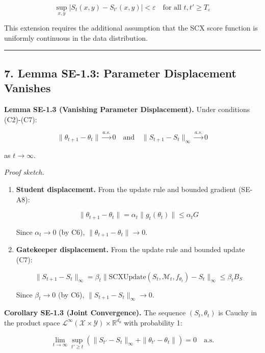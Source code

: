 \documentclass[
  12pt,
]{article}
\begin{document}
\[
\sup_{x,y} |S_t(x,y) - S_{t'}(x,y)| < \varepsilon \quad \text{for all } t, t' \geq T_\varepsilon
\]

This extension requires the additional assumption that the SCX score
function is uniformly continuous in the data distribution.

\begin{center}\rule{0.5\linewidth}{0.5pt}\end{center}

\subsection{7. Lemma SE-1.3: Parameter Displacement
Vanishes}\label{lemma-se-1.3-parameter-displacement-vanishes}

\textbf{Lemma SE-1.3 (Vanishing Parameter Displacement).} Under
conditions (C2)-(C7):

\[
\|\theta_{t+1} - \theta_t\| \xrightarrow{a.s.} 0 \quad \text{and} \quad \|S_{t+1} - S_t\|_\infty \xrightarrow{a.s.} 0
\]

as \(t \to \infty\).

\emph{Proof sketch.}

\begin{enumerate}
\def\labelenumi{\arabic{enumi}.}
\item
  \textbf{Student displacement.} From the update rule and bounded
  gradient (SE-A8):

  \[
  \|\theta_{t+1} - \theta_t\| = \alpha_t \|g_t(\theta_t)\| \leq \alpha_t G
  \]

  Since \(\alpha_t \to 0\) (by C6),
  \(\|\theta_{t+1} - \theta_t\| \to 0\).
\item
  \textbf{Gatekeeper displacement.} From the update rule and bounded
  update (C7):

  \[
  \|S_{t+1} - S_t\|_\infty = \beta_t \|\text{SCXUpdate}(S_t, \mathcal{M}_t, f_{\theta_t}) - S_t\|_\infty \leq \beta_t B_S
  \]

  Since \(\beta_t \to 0\) (by C6), \(\|S_{t+1} - S_t\|_\infty \to 0\).
\end{enumerate}

\textbf{Corollary SE-1.3 (Joint Convergence).} The sequence
\((S_t, \theta_t)\) is Cauchy in the product space
\(\mathcal{L}^\infty(\mathcal{X} \times \mathcal{Y}) \times \mathbb{R}^{d_\theta}\)
with probability 1:

\[
\lim_{t \to \infty} \sup_{t' \geq t} \left( \|S_{t'} - S_t\|_\infty + \|\theta_{t'} - \theta_t\| \right) = 0 \quad \text{a.s.}
\]
\end{document}
